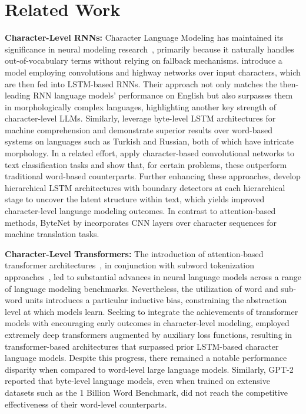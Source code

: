 \section{Related Work}
\label{section:related_work}

\textbf{Character-Level RNNs:} Character Language Modeling has maintained its significance in neural modeling research~\citep{sutskever2011generating,mikolov2012subword,graves2013generating}, primarily because it naturally handles out-of-vocabulary terms without relying on fallback mechanisms. \cite{kim2016character} introduce a model employing convolutions and highway networks over input characters, which are then fed into LSTM-based RNNs. Their approach not only matches the then-leading RNN language models' performance on English but also surpasses them in morphologically complex languages, highlighting another key strength of character-level LLMs. Similarly, \cite{kenter2018byte} leverage byte-level LSTM architectures for machine comprehension and demonstrate superior results over word-based systems on languages such as Turkish and Russian, both of which have intricate morphology. In a related effort, \cite{zhang2015character} apply character-based convolutional networks to text classification tasks and show that, for certain problems, these outperform traditional word-based counterparts. Further enhancing these approaches, \citet{chung2019hierarchical} develop hierarchical LSTM architectures with boundary detectors at each hierarchical stage to uncover the latent structure within text, which yields improved character-level language modeling outcomes. In contrast to attention-based methods, ByteNet by \cite{kalchbrenner2016neural} incorporates CNN layers over character sequences for machine translation tasks.

\textbf{Character-Level Transformers:} The introduction of attention-based transformer architectures~\citep{vaswani2017attention}, in conjunction with subword tokenization approaches~\citep{sennrich-etal-2016-neural}, led to substantial advances in neural language models across a range of language modeling benchmarks. Nevertheless, the utilization of word and sub-word units introduces a particular inductive bias, constraining the abstraction level at which models learn. Seeking to integrate the achievements of transformer models with encouraging early outcomes in character-level modeling, \citet{al2019character} employed extremely deep transformers augmented by auxiliary loss functions, resulting in transformer-based architectures that surpassed prior LSTM-based character language models. Despite this progress, there remained a notable performance disparity when compared to word-level large language models. Similarly, GPT-2~\citep{radfordgpt2} reported that byte-level language models, even when trained on extensive datasets such as the 1 Billion Word Benchmark, did not reach the competitive effectiveness of their word-level counterparts.

